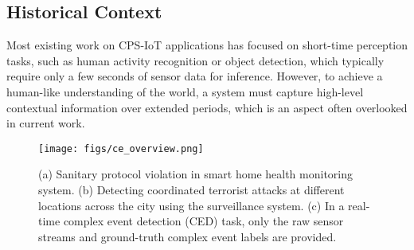 \subsection{Historical Context} 
Most existing work on CPS-IoT applications has focused on short-time perception tasks, such as human activity recognition or object detection, which typically require only a few seconds of sensor data for inference. However, to achieve a human-like understanding of the world, a system must capture high-level contextual information over extended periods, which is an aspect often overlooked in current work. 

\begin{figure*}[t]
    \centering
\texttt{[image: figs/ce\_overview.png]}
    \caption{(a) Sanitary protocol violation in smart home health monitoring system. (b) Detecting coordinated terrorist attacks at different locations across the city using the surveillance system. (c) In a real-time complex event detection (CED) task, only the raw sensor streams and ground-truth complex event labels are provided.}
    \label{fig:ce_overview}
\end{figure*}

